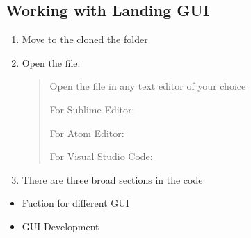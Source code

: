 \documentclass[letterpaper,10pt,english]{sphinxmanual}
\begin{document}
\subsection{Working with Landing GUI}
\label{\detokenize{developer:working-with-landing-gui}}\begin{enumerate}
%
\item {} 
Move to the cloned the folder
\begin{quote}

\begin{sphinxVerbatim}[commandchars=\\\{\}]
 
\end{sphinxVerbatim}
\end{quote}

\item {} 
Open the  file.
\begin{quote}

Open the  file in any text editor of your choice

For Sublime Editor:

\begin{sphinxVerbatim}[commandchars=\\\{\}]
 
\end{sphinxVerbatim}

For Atom Editor:

\begin{sphinxVerbatim}[commandchars=\\\{\}]
 
\end{sphinxVerbatim}

For Visual Studio Code:

\begin{sphinxVerbatim}[commandchars=\\\{\}]
 
\end{sphinxVerbatim}
\end{quote}

\item {} 
There are three broad sections in the code

\end{enumerate}
\begin{itemize}
\item {} 
Fuction for different GUI

\item {} 
GUI Development

\end{itemize}
\end{document}
